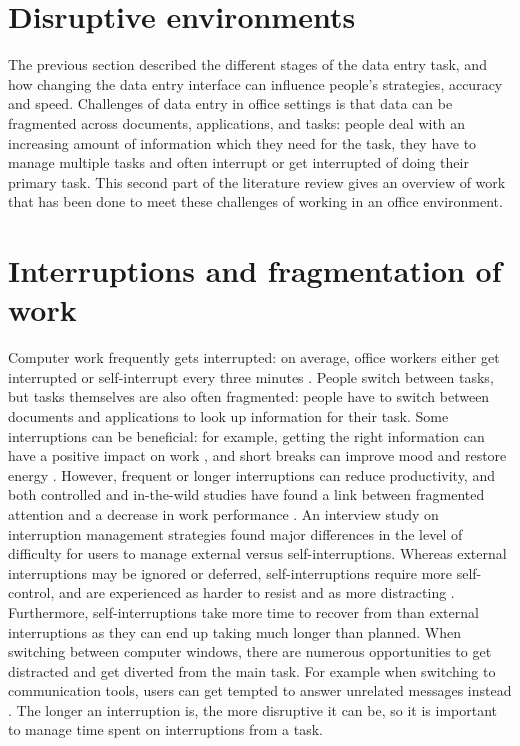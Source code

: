 \section{Disruptive environments}
The previous section described the different stages of the data entry task, and how changing the data entry interface can influence people's strategies, accuracy and speed. Challenges of data entry in office settings is that data can be fragmented across documents, applications, and tasks: people deal with an increasing amount of information which they need for the task, they have to manage multiple tasks and often interrupt or get interrupted of doing their primary task. This second part of the literature review gives an overview of work that has been done to meet these challenges of working in an office environment. 

\section{Interruptions and fragmentation of work}
Computer work frequently gets interrupted: on average, office workers either get interrupted or self-interrupt every three minutes \citep{Gonzalez2004}. People switch between tasks, but tasks themselves are also often fragmented: people have to switch between documents and applications to look up information for their task. Some interruptions can be beneficial: for example, getting the right information can have a positive impact on work \citep{Jin2009}, and short breaks can improve mood and restore energy \citep{Mark2014a}. However, frequent or longer interruptions can reduce productivity, and both controlled and in-the-wild studies have found a link between fragmented attention and a decrease in work performance \citep{Bailey2001, Carrier2015}. 
An interview study on interruption management strategies found major differences in the level of difficulty for users to manage external versus self-interruptions.  Whereas external interruptions may be ignored or deferred, self-interruptions require more self-control, and are experienced as harder to resist and as more distracting \citep{Kim2017}. Furthermore, self-interruptions take more time to recover from than external interruptions as they can end up taking much longer than planned. When switching between computer windows, there are numerous opportunities to get distracted and get diverted from the main task. For example when switching to communication tools, users can get tempted to answer unrelated messages instead \citep{Mark2012}. The longer an interruption is, the more disruptive it can be, so it is important to manage time spent on interruptions from a task.


